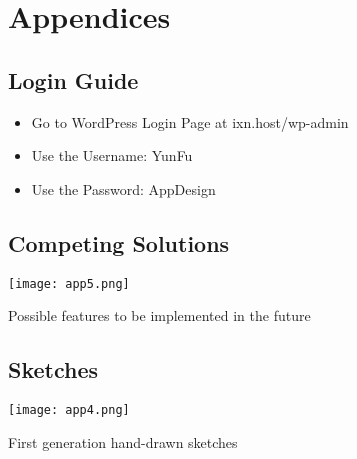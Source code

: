 \documentclass[fontsize=11pt]{extarticle}
\numberwithin{figure}{section} %
\begin{document}
% 

\printbibliography


\newpage
\section{Appendices}

\subsection{Login Guide}
\begin{itemize}

  \item Go to WordPress Login Page at ixn.host/wp-admin
  \item Use the Username: YunFu
  \item Use the Password: AppDesign

\end{itemize}

\begin{landscape}
\subsection{Competing Solutions}
  \begin{table}[H]
      \centering
      \texttt{[image: app5.png]}
      \caption{Possible features to be implemented in the future}
 \end{table}
 \end{landscape}

 \newpage


\begin{landscape}
\subsection{Sketches}
 \begin{table}[H]
      \centering
      \texttt{[image: app4.png]}
      \caption{First generation hand-drawn sketches}
 \end{table}
\end{landscape}
\end{document}
